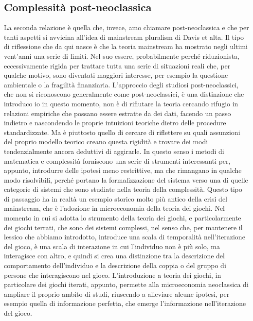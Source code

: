 \documentclass[a4paper, headings=standardclasses]{scrartcl}
\begin{document}
\subsection{Complessità post-neoclassica}
La seconda relazione è quella che, invece, amo chiamare post-neoclassica e che per tanti
aspetti si avvicina all'idea di mainstream pluralism di Davis et alta.
Il tipo di riflessione che da qui nasce è che la teoria mainstream ha mostrato negli ultimi vent'anni una serie di limiti.
Nel suo essere, probabilmente perché riduzionista, eccessivamente rigida per trattare tutta una serie di situazioni reali che, per qualche motivo, sono diventati maggiori interesse, per esempio la questione ambientale o la fragilità finanziaria.
L'approccio degli studiosi post-neoclassici, che non si riconoscono generalmente come post-neoclassici, è una distinzione che introduco io in questo momento,
non è di rifiutare la teoria cercando rifugio in relazioni empiriche che possano essere estratte da dei dati, facendo un passo indietro e nascondendo le proprie intuizioni teoriche dietro delle procedure standardizzate.
Ma è piuttosto quello di cercare di riflettere su quali assunzioni del proprio modello teorico creano questa rigidità e trovare dei modi tendenzialmente ancora deduttivi di aggirarle.
In questo senso i metodi di matematica e complessità forniscono una serie di strumenti interessanti per, appunto, introdurre delle ipotesi meno restrittive,
ma che rimangano in qualche modo risolvibili, perché portano la formalizzazione del sistema verso una di quelle categorie di sistemi che sono studiate nella teoria della complessità.
Questo tipo di passaggio ha in realtà un esempio storico molto più antico della crisi del mainstream, che è l'adozione in microeconomia della teoria dei giochi.
Nel momento in cui si adotta lo strumento della teoria dei giochi, e particolarmente dei giochi terrati, che sono dei sistemi complessi,
nel senso che, per mantenere il lessico che abbiamo introdotto, introduce una scala di temporalità nell'iterazione del gioco,
è una scala di interazione in cui l'individuo non è più solo, ma interagisce con altro,
e quindi si crea una distinzione tra la descrizione del comportamento dell'individuo e la descrizione della coppia o del gruppo di persone che interagiscono nel gioco.
L'introduzione a teoria dei giochi, in particolare dei giochi iterati, appunto, permette alla microeconomia neoclassica di ampliare il proprio ambito di studi,
riuscendo a alleviare alcune ipotesi, per esempio quella di informazione perfetta, che emerge l'informazione nell'iterazione del gioco.
\end{document}
